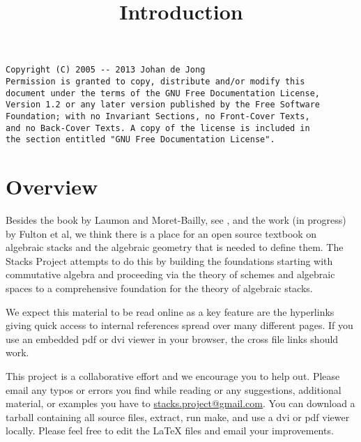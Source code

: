 

%


\title{Introduction}


\maketitle

\label{section-phantom}

\begin{verbatim}
Copyright (C) 2005 -- 2013 Johan de Jong
Permission is granted to copy, distribute and/or modify this
document under the terms of the GNU Free Documentation License,
Version 1.2 or any later version published by the Free Software
Foundation; with no Invariant Sections, no Front-Cover Texts,
and no Back-Cover Texts. A copy of the license is included in
the section entitled "GNU Free Documentation License".
\end{verbatim}

\tableofcontents


\section{Overview}
\label{section-overview}

\noindent
Besides the book by Laumon and Moret-Bailly, see \cite{LM-B}, and the work
(in progress) by Fulton et al, we think there is a place for an open source
textbook on algebraic stacks and the algebraic geometry that is needed
to define them. The Stacks Project attempts to do this by building the
foundations starting with commutative algebra and proceeding via the
theory of schemes and algebraic spaces to a comprehensive foundation for
the theory of algebraic stacks.

\medskip\noindent
We expect this material to be read online as a key feature are the hyperlinks
giving quick access to internal references spread over many different pages.
If you use an embedded pdf or dvi viewer in your browser, the cross file
links should work.

\medskip\noindent
This project is a collaborative effort and we encourage you to help out.
Please email any typos or errors you find while reading or
any suggestions, additional material, or examples you have to
\href{mailto:stacks.project@gmail.com}{stacks.project@gmail.com}.
You can download a tarball containing all source files, extract,
run make, and use a dvi or pdf viewer locally. Please feel free to
edit the LaTeX files and email your improvements.


